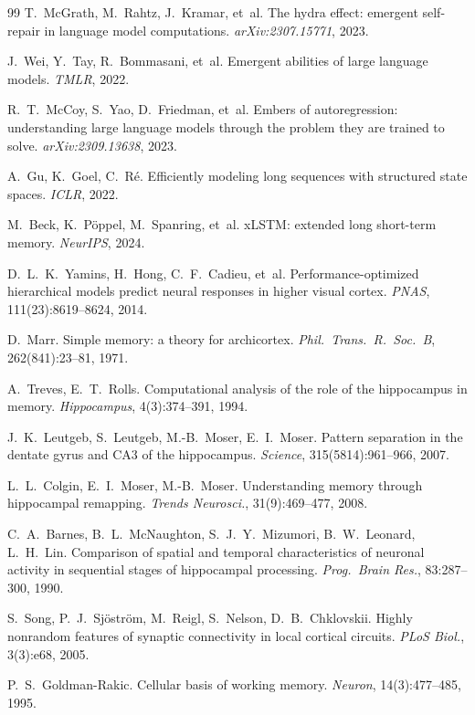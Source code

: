 \documentclass[11pt,a4paper]{article}
\begin{document}
\begin{thebibliography}{99}
T.~McGrath, M.~Rahtz, J.~Kramar, et~al.
The hydra effect: emergent self-repair in language model
computations.
\emph{arXiv:2307.15771}, 2023.

J.~Wei, Y.~Tay, R.~Bommasani, et~al.
Emergent abilities of large language models.
\emph{TMLR}, 2022.

R.~T.~McCoy, S.~Yao, D.~Friedman, et~al.
Embers of autoregression: understanding large language models
through the problem they are trained to solve.
\emph{arXiv:2309.13638}, 2023.

A.~Gu, K.~Goel, C.~R\'e.
Efficiently modeling long sequences with structured state spaces.
\emph{ICLR}, 2022.

M.~Beck, K.~P\"oppel, M.~Spanring, et~al.
xLSTM: extended long short-term memory.
\emph{NeurIPS}, 2024.

D.~L.~K.~Yamins, H.~Hong, C.~F.~Cadieu, et~al.
Performance-optimized hierarchical models predict neural responses
in higher visual cortex.
\emph{PNAS}, 111(23):8619--8624, 2014.

D.~Marr.
Simple memory: a theory for archicortex.
\emph{Phil.\ Trans.\ R.\ Soc.\ B}, 262(841):23--81, 1971.

A.~Treves, E.~T.~Rolls.
Computational analysis of the role of the hippocampus in memory.
\emph{Hippocampus}, 4(3):374--391, 1994.

J.~K.~Leutgeb, S.~Leutgeb, M.-B.~Moser, E.~I.~Moser.
Pattern separation in the dentate gyrus and CA3 of the hippocampus.
\emph{Science}, 315(5814):961--966, 2007.

L.~L.~Colgin, E.~I.~Moser, M.-B.~Moser.
Understanding memory through hippocampal remapping.
\emph{Trends Neurosci.}, 31(9):469--477, 2008.

C.~A.~Barnes, B.~L.~McNaughton, S.~J.~Y.~Mizumori, B.~W.~Leonard,
L.~H.~Lin.
Comparison of spatial and temporal characteristics of neuronal
activity in sequential stages of hippocampal processing.
\emph{Prog.\ Brain Res.}, 83:287--300, 1990.

S.~Song, P.~J.~Sj\"ostr\"om, M.~Reigl, S.~Nelson, D.~B.~Chklovskii.
Highly nonrandom features of synaptic connectivity in local cortical
circuits.
\emph{PLoS Biol.}, 3(3):e68, 2005.

P.~S.~Goldman-Rakic.
Cellular basis of working memory.
\emph{Neuron}, 14(3):477--485, 1995.


\end{thebibliography}
\end{document}
